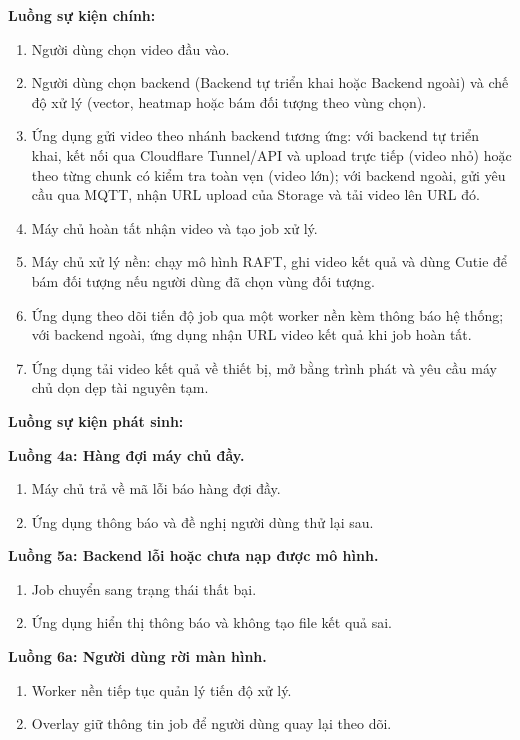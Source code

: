 \documentclass[../DoAn.tex]{subfiles}
\begin{document}
\textbf{Luồng sự kiện chính:}
\begin{enumerate}
    \item Người dùng chọn video đầu vào.
    \item Người dùng chọn backend (Backend tự triển khai hoặc Backend ngoài) và chế độ xử lý (vector, heatmap hoặc bám đối tượng theo vùng chọn).
    \item Ứng dụng gửi video theo nhánh backend tương ứng: với backend tự triển khai, kết nối qua Cloudflare Tunnel/API và upload trực tiếp (video nhỏ) hoặc theo từng chunk có kiểm tra toàn vẹn (video lớn); với backend ngoài, gửi yêu cầu qua MQTT, nhận URL upload của Storage và tải video lên URL đó.
    \item Máy chủ hoàn tất nhận video và tạo job xử lý.
    \item Máy chủ xử lý nền: chạy mô hình RAFT, ghi video kết quả và dùng Cutie để bám đối tượng nếu người dùng đã chọn vùng đối tượng.
    \item Ứng dụng theo dõi tiến độ job qua một worker nền kèm thông báo hệ thống; với backend ngoài, ứng dụng nhận URL video kết quả khi job hoàn tất.
    \item Ứng dụng tải video kết quả về thiết bị, mở bằng trình phát và yêu cầu máy chủ dọn dẹp tài nguyên tạm.
\end{enumerate}

\textbf{Luồng sự kiện phát sinh:}

\textbf{Luồng 4a: Hàng đợi máy chủ đầy.}
\begin{enumerate}[label=4a.\arabic*., leftmargin=2.6em, align=left, labelsep=0.5em]
    \item Máy chủ trả về mã lỗi báo hàng đợi đầy.
    \item Ứng dụng thông báo và đề nghị người dùng thử lại sau.
\end{enumerate}

\textbf{Luồng 5a: Backend lỗi hoặc chưa nạp được mô hình.}
\begin{enumerate}[label=5a.\arabic*., leftmargin=2.6em, align=left, labelsep=0.5em]
    \item Job chuyển sang trạng thái thất bại.
    \item Ứng dụng hiển thị thông báo và không tạo file kết quả sai.
\end{enumerate}

\textbf{Luồng 6a: Người dùng rời màn hình.}
\begin{enumerate}[label=6a.\arabic*., leftmargin=2.6em, align=left, labelsep=0.5em]
    \item Worker nền tiếp tục quản lý tiến độ xử lý.
    \item Overlay giữ thông tin job để người dùng quay lại theo dõi.
\end{enumerate}
\end{document}
